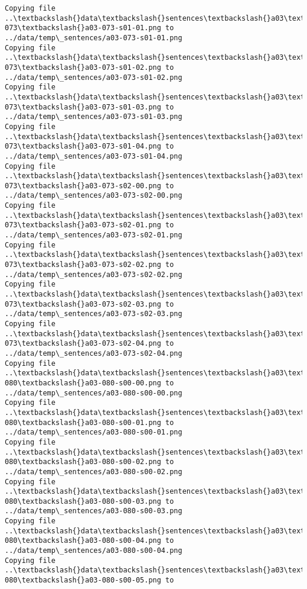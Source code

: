 \documentclass[11pt]{article}
\begin{document}
\begin{Verbatim}[commandchars=\\\{\}]
Copying file ..\textbackslash{}data\textbackslash{}sentences\textbackslash{}a03\textbackslash{}a03-073\textbackslash{}a03-073-s01-01.png to
../data/temp\_sentences/a03-073-s01-01.png
Copying file ..\textbackslash{}data\textbackslash{}sentences\textbackslash{}a03\textbackslash{}a03-073\textbackslash{}a03-073-s01-02.png to
../data/temp\_sentences/a03-073-s01-02.png
Copying file ..\textbackslash{}data\textbackslash{}sentences\textbackslash{}a03\textbackslash{}a03-073\textbackslash{}a03-073-s01-03.png to
../data/temp\_sentences/a03-073-s01-03.png
Copying file ..\textbackslash{}data\textbackslash{}sentences\textbackslash{}a03\textbackslash{}a03-073\textbackslash{}a03-073-s01-04.png to
../data/temp\_sentences/a03-073-s01-04.png
Copying file ..\textbackslash{}data\textbackslash{}sentences\textbackslash{}a03\textbackslash{}a03-073\textbackslash{}a03-073-s02-00.png to
../data/temp\_sentences/a03-073-s02-00.png
Copying file ..\textbackslash{}data\textbackslash{}sentences\textbackslash{}a03\textbackslash{}a03-073\textbackslash{}a03-073-s02-01.png to
../data/temp\_sentences/a03-073-s02-01.png
Copying file ..\textbackslash{}data\textbackslash{}sentences\textbackslash{}a03\textbackslash{}a03-073\textbackslash{}a03-073-s02-02.png to
../data/temp\_sentences/a03-073-s02-02.png
Copying file ..\textbackslash{}data\textbackslash{}sentences\textbackslash{}a03\textbackslash{}a03-073\textbackslash{}a03-073-s02-03.png to
../data/temp\_sentences/a03-073-s02-03.png
Copying file ..\textbackslash{}data\textbackslash{}sentences\textbackslash{}a03\textbackslash{}a03-073\textbackslash{}a03-073-s02-04.png to
../data/temp\_sentences/a03-073-s02-04.png
Copying file ..\textbackslash{}data\textbackslash{}sentences\textbackslash{}a03\textbackslash{}a03-080\textbackslash{}a03-080-s00-00.png to
../data/temp\_sentences/a03-080-s00-00.png
Copying file ..\textbackslash{}data\textbackslash{}sentences\textbackslash{}a03\textbackslash{}a03-080\textbackslash{}a03-080-s00-01.png to
../data/temp\_sentences/a03-080-s00-01.png
Copying file ..\textbackslash{}data\textbackslash{}sentences\textbackslash{}a03\textbackslash{}a03-080\textbackslash{}a03-080-s00-02.png to
../data/temp\_sentences/a03-080-s00-02.png
Copying file ..\textbackslash{}data\textbackslash{}sentences\textbackslash{}a03\textbackslash{}a03-080\textbackslash{}a03-080-s00-03.png to
../data/temp\_sentences/a03-080-s00-03.png
Copying file ..\textbackslash{}data\textbackslash{}sentences\textbackslash{}a03\textbackslash{}a03-080\textbackslash{}a03-080-s00-04.png to
../data/temp\_sentences/a03-080-s00-04.png
Copying file ..\textbackslash{}data\textbackslash{}sentences\textbackslash{}a03\textbackslash{}a03-080\textbackslash{}a03-080-s00-05.png to

\end{Verbatim}
\end{document}
